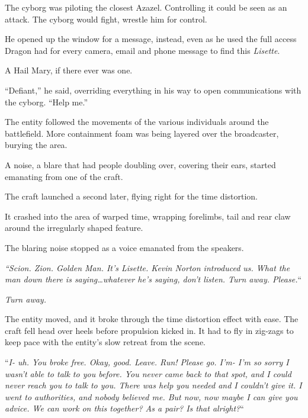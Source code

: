 The cyborg was piloting the closest Azazel.  Controlling it could be seen as an attack.  The cyborg would fight, wrestle him for control.



He opened up the window for a message, instead, even as he used the full access Dragon had for every camera, email and phone message to find this \emph{Lisette}.



A Hail Mary, if there ever was one.



``Defiant,'' he said, overriding everything in his way to open communications with the cyborg.  ``Help me.''



\sectionbreak



The entity followed the movements of the various individuals around the battlefield.  More containment foam was being layered over the broadcaster, burying the area.



A noise, a blare that had people doubling over, covering their ears, started emanating from one of the craft.



The craft launched a second later, flying right for the time distortion.



It crashed into the area of warped time, wrapping forelimbs, tail and rear claw around the irregularly shaped feature.



The blaring noise stopped as a voice emanated from the speakers.



\emph{``Scion.  Zion.  Golden Man.  It's Lisette.  Kevin Norton introduced us.  What the man down there is saying\ldots whatever he's saying, don't listen.  Turn away.  Please.}``



\emph{Turn away.}



The entity moved, and it broke through the time distortion effect with ease.  The craft fell head over heels before propulsion kicked in.  It had to fly in zig-zags to keep pace with the entity's slow retreat from the scene.



``\emph{I- uh.  You broke free.  Okay, good.  Leave.  Run!  Please go.  I'm- I'm so sorry I wasn't able to talk to you before.  You never came back to that spot, and I could never reach you to talk to you.  There was help you needed and I couldn't give it.  I went to authorities, and nobody believed me.  But now, now maybe I can give you advice.  We can work on this together?  As a pair?  Is that alright?}``



